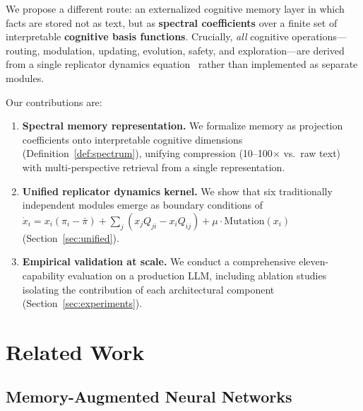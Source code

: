 \documentclass[review]{elsarticle}
\begin{document}
We propose a different route: an externalized cognitive memory layer in which
facts are stored not as text, but as \textbf{spectral coefficients} over a
finite set of interpretable \textbf{cognitive basis functions}. Crucially,
\textit{all} cognitive operations---routing, modulation, updating, evolution,
safety, and exploration---are derived from a single replicator dynamics
equation~\cite{taylor1978evolutionary,hofbauer1998evolutionary} rather than
implemented as separate modules.

Our contributions are:
\begin{enumerate}[leftmargin=*,itemsep=0pt]
\item \textbf{Spectral memory representation.} We formalize memory as
  projection coefficients onto interpretable cognitive dimensions
  (Definition~\ref{def:spectrum}), unifying compression (10--100$\times$ vs.\
  raw text) with multi-perspective retrieval from a single representation.
\item \textbf{Unified replicator dynamics kernel.} We show that six
  traditionally independent modules emerge as boundary conditions of
  $\dot{x}_i = x_i(\pi_i - \bar{\pi}) + \sum_j(x_j Q_{ji} - x_i Q_{ij})
  + \mu \cdot \text{Mutation}(x_i)$ (Section~\ref{sec:unified}).
\item \textbf{Empirical validation at scale.} We conduct a comprehensive
  eleven-capability evaluation on a production LLM, including ablation
  studies isolating the contribution of each architectural component
  (Section~\ref{sec:experiments}).
\end{enumerate}

\section{Related Work}

\subsection{Memory-Augmented Neural Networks}
\end{document}

